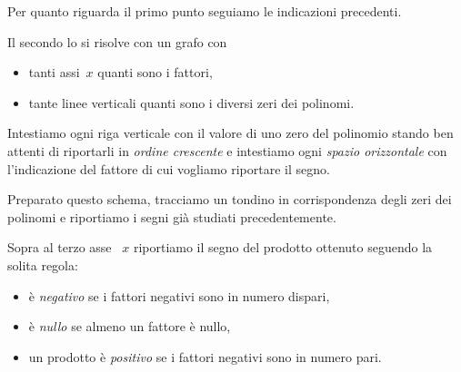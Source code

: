 Per quanto riguarda il primo punto seguiamo le indicazioni precedenti. 

Il secondo lo si risolve con un grafo con
\begin{itemize} [noitemsep]
\item tanti assi~\(x\) quanti sono i fattori, 
\item tante linee verticali quanti sono i diversi zeri dei polinomi. 
\end{itemize}

Intestiamo ogni riga verticale con il valore di uno zero del polinomio
stando ben attenti di riportarli in \emph{ordine crescente} e intestiamo 
ogni \emph{spazio orizzontale} con l'indicazione del fattore di cui 
vogliamo riportare il segno. 

Preparato questo schema, tracciamo un tondino in corrispondenza degli zeri 
dei polinomi e riportiamo i segni già studiati precedentemente. 

Sopra al terzo asse~ \(x\) riportiamo il segno del prodotto ottenuto 
seguendo la solita regola: 
\begin{itemize} [noitemsep]
\item è \emph{negativo} se i fattori negativi sono in numero dispari, 
\item è \emph{nullo} se almeno un fattore è nullo,
\item un prodotto è \emph{positivo} se i fattori negativi sono in numero 
pari. 
\end{itemize}


